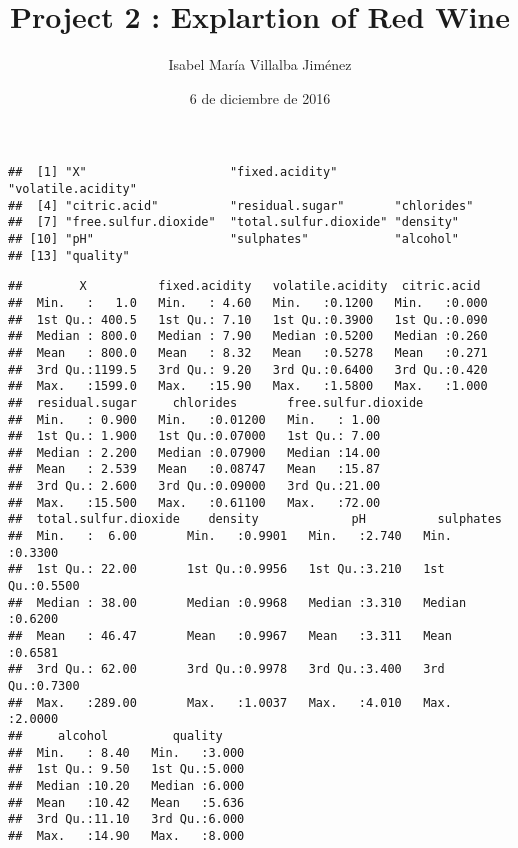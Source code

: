 \documentclass[]{article}
\title{Project 2 : Explartion of Red Wine}
\author{Isabel María Villalba Jiménez}
\date{6 de diciembre de 2016}
\begin{document}
\maketitle

\begin{verbatim}
##  [1] "X"                    "fixed.acidity"        "volatile.acidity"    
##  [4] "citric.acid"          "residual.sugar"       "chlorides"           
##  [7] "free.sulfur.dioxide"  "total.sulfur.dioxide" "density"             
## [10] "pH"                   "sulphates"            "alcohol"             
## [13] "quality"
\end{verbatim}

\begin{verbatim}
##        X          fixed.acidity   volatile.acidity  citric.acid   
##  Min.   :   1.0   Min.   : 4.60   Min.   :0.1200   Min.   :0.000  
##  1st Qu.: 400.5   1st Qu.: 7.10   1st Qu.:0.3900   1st Qu.:0.090  
##  Median : 800.0   Median : 7.90   Median :0.5200   Median :0.260  
##  Mean   : 800.0   Mean   : 8.32   Mean   :0.5278   Mean   :0.271  
##  3rd Qu.:1199.5   3rd Qu.: 9.20   3rd Qu.:0.6400   3rd Qu.:0.420  
##  Max.   :1599.0   Max.   :15.90   Max.   :1.5800   Max.   :1.000  
##  residual.sugar     chlorides       free.sulfur.dioxide
##  Min.   : 0.900   Min.   :0.01200   Min.   : 1.00      
##  1st Qu.: 1.900   1st Qu.:0.07000   1st Qu.: 7.00      
##  Median : 2.200   Median :0.07900   Median :14.00      
##  Mean   : 2.539   Mean   :0.08747   Mean   :15.87      
##  3rd Qu.: 2.600   3rd Qu.:0.09000   3rd Qu.:21.00      
##  Max.   :15.500   Max.   :0.61100   Max.   :72.00      
##  total.sulfur.dioxide    density             pH          sulphates     
##  Min.   :  6.00       Min.   :0.9901   Min.   :2.740   Min.   :0.3300  
##  1st Qu.: 22.00       1st Qu.:0.9956   1st Qu.:3.210   1st Qu.:0.5500  
##  Median : 38.00       Median :0.9968   Median :3.310   Median :0.6200  
##  Mean   : 46.47       Mean   :0.9967   Mean   :3.311   Mean   :0.6581  
##  3rd Qu.: 62.00       3rd Qu.:0.9978   3rd Qu.:3.400   3rd Qu.:0.7300  
##  Max.   :289.00       Max.   :1.0037   Max.   :4.010   Max.   :2.0000  
##     alcohol         quality     
##  Min.   : 8.40   Min.   :3.000  
##  1st Qu.: 9.50   1st Qu.:5.000  
##  Median :10.20   Median :6.000  
##  Mean   :10.42   Mean   :5.636  
##  3rd Qu.:11.10   3rd Qu.:6.000  
##  Max.   :14.90   Max.   :8.000
\end{verbatim}
\end{document}
